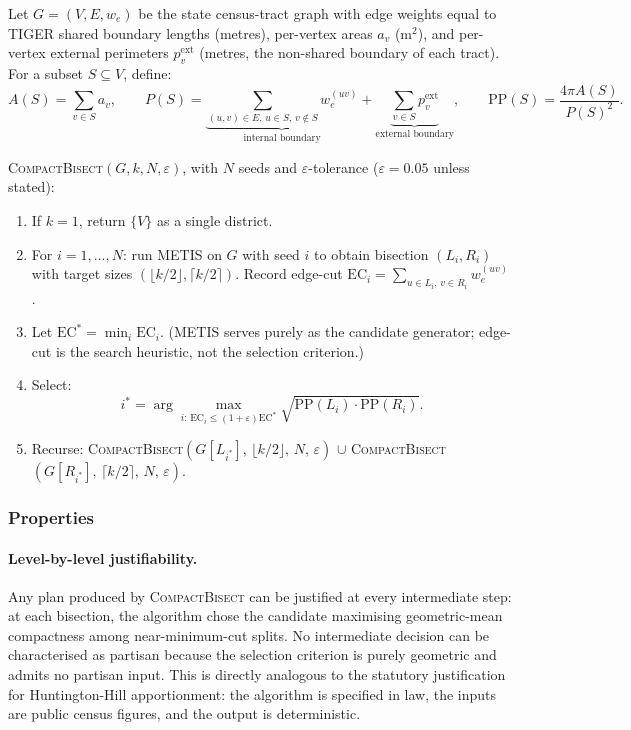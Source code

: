 \begin{definition}
\label{def:compactbisect}
Let $G = (V, E, w_e)$ be the state census-tract graph with edge weights equal
to TIGER shared boundary lengths (metres), per-vertex areas $a_v$ (m$^2$), and
per-vertex external perimeters $p_v^{\mathrm{ext}}$ (metres, the non-shared
boundary of each tract). For a subset $S \subseteq V$, define:
\[
  A(S) = \sum_{v \in S} a_v, \qquad
  P(S) = \underbrace{\sum_{(u,v)\in E,\, u\in S,\, v\notin S} w_e^{(uv)}}_{\text{internal boundary}}
        + \underbrace{\sum_{v\in S} p_v^{\mathrm{ext}}}_{\text{external boundary}},
  \qquad
  \mathrm{PP}(S) = \frac{4\pi A(S)}{P(S)^2}.
\]

\textsc{CompactBisect}$(G, k, N, \varepsilon)$, with $N$ seeds and
$\varepsilon$-tolerance ($\varepsilon = 0.05$ unless stated):
\begin{enumerate}
  \item If $k = 1$, return $\{V\}$ as a single district.
  \item For $i = 1, \ldots, N$: run METIS on $G$ with seed $i$ to obtain
        bisection $(L_i, R_i)$ with target sizes
        $(\lfloor k/2\rfloor, \lceil k/2\rceil)$.
        Record edge-cut $\mathrm{EC}_i = \sum_{u\in L_i,\, v\in R_i} w_e^{(uv)}$.
  \item Let $\mathrm{EC}^* = \min_i \mathrm{EC}_i$.
        (METIS serves purely as the candidate generator; edge-cut is the
        search heuristic, not the selection criterion.)
  \item Select:
        \[
          i^* = \arg\max_{i:\, \mathrm{EC}_i \leq (1+\varepsilon)\mathrm{EC}^*}
                \sqrt{\mathrm{PP}(L_i)\cdot\mathrm{PP}(R_i)}.
        \]
  \item Recurse: \textsc{CompactBisect}$(G[L_{i^*}],\,\lfloor k/2\rfloor,\,N,\,\varepsilon)$
        $\cup$ \textsc{CompactBisect}$(G[R_{i^*}],\,\lceil k/2\rceil,\,N,\,\varepsilon)$.
\end{enumerate}
\end{definition}

\subsubsection{Properties}

\paragraph{Level-by-level justifiability.}
Any plan produced by \textsc{CompactBisect} can be justified at every
intermediate step: at each bisection, the algorithm chose the candidate
maximising geometric-mean compactness among near-minimum-cut splits.
No intermediate decision can be characterised as partisan because the
selection criterion is purely geometric and admits no partisan input.
This is directly analogous to the statutory justification for
Huntington-Hill apportionment: the algorithm is specified in law, the
inputs are public census figures, and the output is deterministic.

